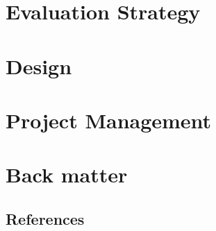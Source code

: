 \documentclass[11pt]{article}
\begin{document}
\newpage
\section{Evaluation Strategy}


\newpage
\section{Design}\label{sec:Design}


\newpage
\section{Project Management}


\newpage
\appendix
\section{Back matter}
\subsection{References}
\printbibliography
\end{document}

